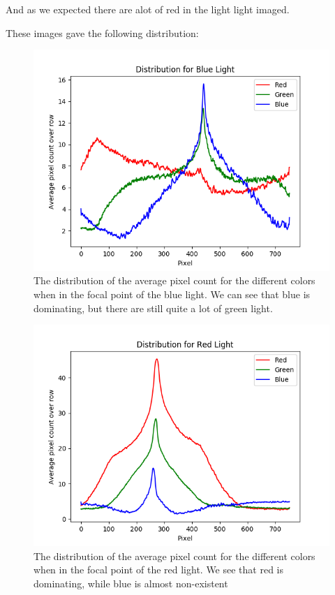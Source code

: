 \documentclass{emulateapj}
\begin{document}
And as we expected there are alot of red in the light light imaged.

These images gave the following distribution:

\begin{figure}[H]
\centering
\includegraphics[scale=0.3]{blueDist.png}
\caption{The distribution of the average pixel count for the different colors when in the focal point of the blue light. We can see that blue is dominating, but there are still quite a lot of green light.}
\label{img:green}
\end{figure}

\begin{figure}[H]
\centering
\includegraphics[scale=0.3]{redDist.png}
\caption{The distribution of the average pixel count for the different colors when in the focal point of the red light. We see that red is dominating, while blue is almost non-existent}
\label{img:green}
\end{figure}
\end{document}
